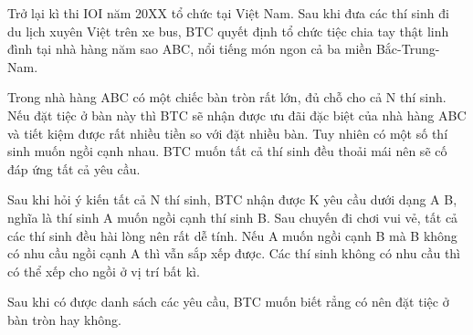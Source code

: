 Trở lại kì thi IOI năm 20XX tổ chức tại Việt Nam. Sau khi đưa các thí sinh đi du lịch xuyên Việt trên xe bus, BTC quyết định tổ chức tiệc chia tay thật linh đình tại nhà hàng năm sao ABC, nổi tiếng món ngon cả ba miền Bắc-Trung-Nam.

Trong nhà hàng ABC có một chiếc bàn tròn rất lớn, đủ chỗ cho cả N thí sinh. Nếu đặt tiệc ở bàn này thì BTC sẽ nhận được ưu đãi đặc biệt của nhà hàng ABC và tiết kiệm được rất nhiều tiền so với đặt nhiều bàn. Tuy nhiên có một số thí sinh muốn ngồi cạnh nhau. BTC muốn tất cả thí sinh đều thoải mái nên sẽ cố đáp ứng tất cả yêu cầu.

Sau khi hỏi ý kiến tất cả N thí sinh, BTC nhận được K yêu cầu dưới dạng A B, nghĩa là thí sinh A muốn ngồi cạnh thí sinh B. Sau chuyến đi chơi vui vẻ, tất cả các thí sinh đều hài lòng nên rất dễ tính. Nếu A muốn ngồi cạnh B mà B không có nhu cầu ngồi cạnh A thì vẫn sắp xếp được. Các thí sinh không có nhu cầu thì có thể xếp cho ngồi ở vị trí bất kì.

Sau khi có được danh sách các yêu cầu, BTC muốn biết rẳng có nên đặt tiệc ở bàn tròn hay không.